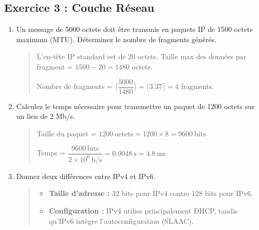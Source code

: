 \documentclass[a4paper,12pt]{article}
\begin{document}
\subsection*{Exercice 3 : Couche Réseau}
\begin{enumerate}
    \item Un message de 5000 octets doit être transmis en paquets IP de 1500 octets maximum (MTU). Déterminez le nombre de fragments générés.
    \begin{quote}
        L'en-tête IP standard est de 20 octets.
        Taille max des données par fragment = $1500 - 20 = 1480$ octets.
        
        Nombre de fragments = $\lceil \dfrac{5000}{1480} \rceil = \lceil 3.37 \rceil = 4$ fragments.
    \end{quote}

    \item Calculez le temps nécessaire pour transmettre un paquet de 1200 octets sur un lien de 2 Mb/s.
    \begin{quote}
        Taille du paquet = $1200~\text{octets} = 1200 \times 8 = 9600~\text{bits}$
        
        Temps = $\dfrac{9600~\text{bits}}{2 \times 10^6~\text{b/s}} = 0.0048~\text{s} = 4.8~\text{ms}$
    \end{quote}

    \item Donnez deux différences entre IPv4 et IPv6.
    \begin{quote}
        \begin{itemize}
            \item \textbf{Taille d'adresse :} 32 bits pour IPv4 contre 128 bits pour IPv6.
            \item \textbf{Configuration :} IPv4 utilise principalement DHCP, tandis qu'IPv6 intègre l'autoconfiguration (SLAAC).
        \end{itemize}
    \end{quote}
\end{enumerate}
\end{document}
